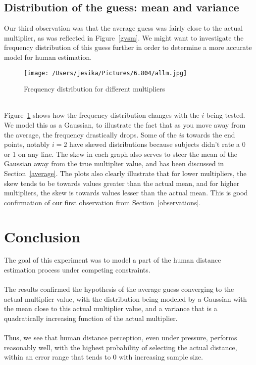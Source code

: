 \documentclass[12pt]{article}
\begin{document}
\subsection{Distribution of the guess: mean and variance}
Our third observation was that the average guess was fairly close to the actual multiplier, as was reflected in Figure~\ref{gvsm}. We might want to investigate the frequency distribution of this guess further in order to determine a more accurate model for human estimation. 
\begin{figure}[!ht]
  \centering
    \texttt{[image: /Users/jesika/Pictures/6.804/allm.jpg]}
  \caption{Frequency distribution for different multipliers}
  \label{allm}
\end{figure} \\
Figure~\ref{allm} shows how the frequency distribution changes with the $i$ being tested. We model this as a Gaussian, to illustrate the fact that as you move away from the average, the frequency drastically drops. Some of the $i$s towards the end points, notably $i=2$ have skewed distributions because subjects didn't rate a 0 or 1 on any line. The skew in each graph also serves to steer the mean of the Gaussian away from the true multiplier value, and has been discussed in Section~\ref{average}. The plots also clearly illustrate that for lower multipliers, the skew tends to be towards values greater than the actual mean, and for higher multipliers, the skew is towards values lesser than the actual mean. This is good confirmation of our first observation from Section~\ref{observations}. 

\section{Conclusion}\label{conclusion}
The goal of this experiment was to model a part of the human distance estimation process under competing constraints. 
\\\\The results confirmed the hypothesis of the average guess converging to the actual multiplier value, with the distribution being modeled by a Gaussian with the mean close to this actual multiplier value, and a variance that is a quadratically increasing function of the actual multiplier. 
\\\\Thus, we see that human distance perception, even under pressure, performs reasonably well, with the highest probability of selecting the actual distance, within an error range that tends to 0 with increasing sample size. 
\end{document}
